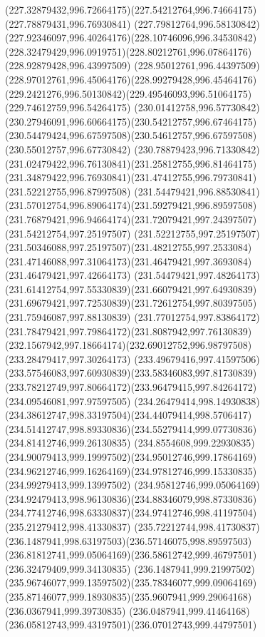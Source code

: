 {{\curveto(227.32879432,996.72664175)(227.54212764,996.74664175)(227.78879431,996.76930841)
\curveto(227.79812764,996.58130842)(227.92346097,996.40264176)(228.10746096,996.34530842)
\curveto(228.32479429,996.0919751)(228.80212761,996.07864176)(228.92879428,996.43997509)
\curveto(228.95012761,996.44397509)(228.97012761,996.45064176)(228.99279428,996.45464176)
\curveto(229.2421276,996.50130842)(229.49546093,996.51064175)(229.74612759,996.54264175)
\curveto(230.01412758,996.57730842)(230.27946091,996.60664175)(230.54212757,996.67464175)
\curveto(230.54479424,996.67597508)(230.54612757,996.67597508)(230.55012757,996.67730842)
\curveto(230.78879423,996.71330842)(231.02479422,996.76130841)(231.25812755,996.81464175)
\curveto(231.34879422,996.76930841)(231.47412755,996.79730841)(231.52212755,996.87997508)
\curveto(231.54479421,996.88530841)(231.57012754,996.89064174)(231.59279421,996.89597508)
\curveto(231.76879421,996.94664174)(231.72079421,997.24397507)(231.54212754,997.25197507)
\curveto(231.52212755,997.25197507)(231.50346088,997.25197507)(231.48212755,997.2533084)
\curveto(231.47146088,997.31064173)(231.46479421,997.3693084)(231.46479421,997.42664173)
\curveto(231.54479421,997.48264173)(231.61412754,997.55330839)(231.66079421,997.64930839)
\curveto(231.69679421,997.72530839)(231.72612754,997.80397505)(231.75946087,997.88130839)
\curveto(231.77012754,997.83864172)(231.78479421,997.79864172)(231.8087942,997.76130839)
\curveto(232.1567942,997.18664174)(232.69012752,996.98797508)(233.28479417,997.30264173)
\curveto(233.49679416,997.41597506)(233.57546083,997.60930839)(233.58346083,997.81730839)
\curveto(233.78212749,997.80664172)(233.96479415,997.84264172)(234.09546081,997.97597505)
\curveto(234.26479414,998.14930838)(234.38612747,998.33197504)(234.44079414,998.5706417)
\curveto(234.51412747,998.89330836)(234.55279414,999.07730836)(234.81412746,999.26130835)
\curveto(234.8554608,999.22930835)(234.90079413,999.19997502)(234.95012746,999.17864169)
\curveto(234.96212746,999.16264169)(234.97812746,999.15330835)(234.99279413,999.13997502)
\curveto(234.95812746,999.05064169)(234.92479413,998.96130836)(234.88346079,998.87330836)
\curveto(234.77412746,998.63330837)(234.97412746,998.41197504)(235.21279412,998.41330837)
\curveto(235.72212744,998.41730837)(236.1487941,998.63197503)(236.57146075,998.89597503)
\curveto(236.81812741,999.05064169)(236.58612742,999.46797501)(236.32479409,999.34130835)
\curveto(236.1487941,999.21997502)(235.96746077,999.13597502)(235.78346077,999.09064169)
\curveto(235.87146077,999.18930835)(235.9607941,999.29064168)(236.0367941,999.39730835)
\curveto(236.0487941,999.41464168)(236.05812743,999.43197501)(236.07012743,999.44797501)
}}
